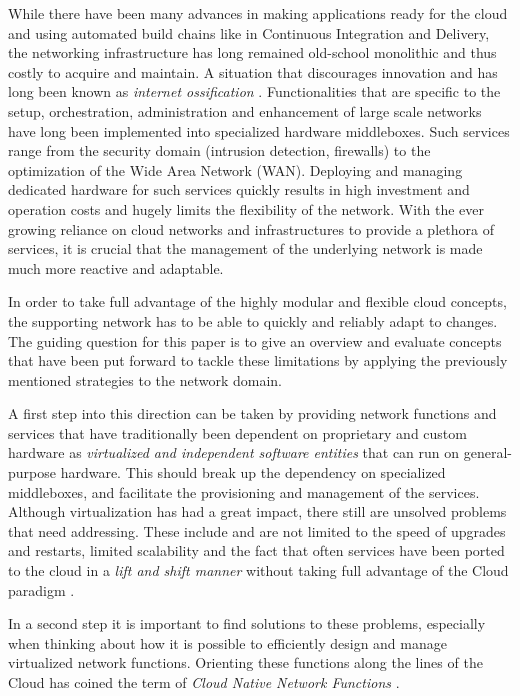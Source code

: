 While there have been many advances in making applications ready for the cloud  and using automated build chains like in Continuous Integration and Delivery,  the networking infrastructure has long remained old-school monolithic and thus costly to acquire and maintain. A situation that discourages innovation and has long been known as \textit{internet ossification} \cite{nunes2014survey}. Functionalities that are specific to the setup, orchestration, administration and enhancement of large scale networks have long been implemented into specialized hardware middleboxes. Such services range from the security domain (intrusion detection, firewalls) to the optimization of the Wide Area Network (WAN). Deploying and managing dedicated hardware for such services quickly results in high investment and operation costs and hugely limits the flexibility of the network. With the ever growing reliance on cloud networks and infrastructures to provide a plethora of services, it is crucial that the management of the underlying network is made much more reactive and adaptable. 

In order to take full advantage of the highly modular and flexible cloud concepts, the supporting network has to be able to quickly and reliably adapt to changes. The guiding question for this paper is to give an overview and evaluate concepts that have been put forward to tackle these limitations by applying the previously mentioned strategies to the network domain.

A first step into this direction can be taken by providing network functions  and services that have traditionally been dependent on proprietary and custom hardware as \textit{virtualized and independent software entities } that can run on general-purpose hardware. This should break up the dependency on specialized middleboxes, and facilitate the provisioning and management of the services. Although virtualization has had a great impact, there still are unsolved problems that need addressing. These include and are not limited to the speed of upgrades and restarts, limited scalability and the fact that often services have been ported to the cloud in a \textit{lift and shift manner} without taking full advantage of the Cloud paradigm \cite{CNF}.

In a second step it is important to find solutions to these problems, especially when thinking about how it is possible to efficiently design and manage virtualized network functions. Orienting these functions along the lines of the Cloud has coined the term of \textit{Cloud Native Network Functions} \cite{CNF} \cite{inproceedings} \cite{evolutionnfv}. 

